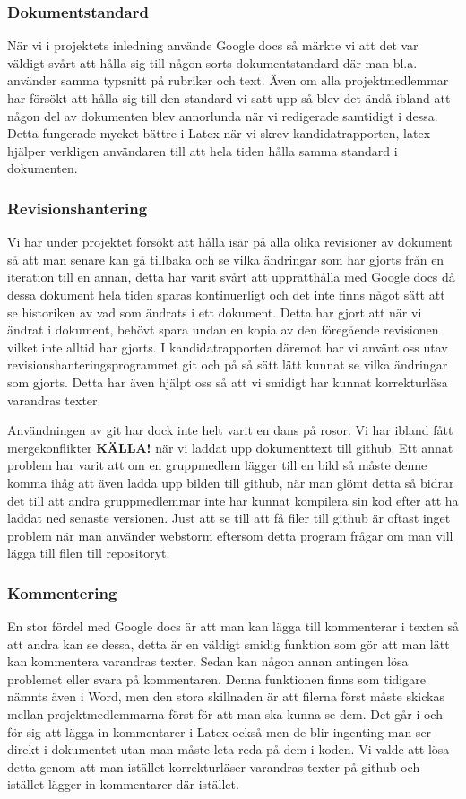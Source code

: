 \subsubsection{Dokumentstandard}
När vi i projektets inledning använde Google docs så märkte vi att det var väldigt svårt att hålla sig till någon sorts dokumentstandard där man bl.a. använder samma typsnitt på rubriker och text. Även om alla projektmedlemmar har försökt att hålla sig till den standard vi satt upp så blev det ändå ibland att någon del av dokumenten blev annorlunda när vi redigerade samtidigt i dessa. Detta fungerade mycket bättre i Latex när vi skrev kandidatrapporten, latex hjälper verkligen användaren till att hela tiden hålla samma standard i dokumenten.

\subsubsection{Revisionshantering}
Vi har under projektet försökt att hålla isär på alla olika revisioner av dokument så att man senare kan gå tillbaka och se vilka ändringar som har gjorts från en iteration till en annan, detta har varit svårt att upprätthålla med Google docs då dessa dokument hela tiden sparas kontinuerligt och det inte finns något sätt att se historiken av vad som ändrats i ett dokument. Detta har gjort att när vi ändrat i dokument, behövt spara undan en kopia av den föregående revisionen vilket inte alltid har gjorts. I kandidatrapporten däremot har vi använt oss utav revisionshanteringsprogrammet git och på så sätt lätt kunnat se vilka ändringar som gjorts. Detta har även hjälpt oss så att vi smidigt har kunnat korrekturläsa varandras texter. 

Användningen av git har dock inte helt varit en dans på rosor. Vi har ibland fått mergekonflikter \textbf{KÄLLA!} när vi laddat upp dokumenttext till github. Ett annat problem har varit att om en gruppmedlem lägger till en bild så måste denne komma ihåg att även ladda upp bilden till github, när man glömt detta så bidrar det till att andra gruppmedlemmar inte har kunnat kompilera sin kod efter att ha laddat ned senaste versionen. Just att se till att få filer till github är oftast inget problem när man använder webstorm eftersom detta program frågar om man vill lägga till filen till repositoryt.

\subsubsection{Kommentering}
En stor fördel med Google docs är att man kan lägga till kommenterar i texten så att andra kan se dessa, detta är en väldigt smidig funktion som gör att man lätt kan kommentera varandras texter. Sedan kan någon annan antingen lösa problemet eller svara på kommentaren. Denna funktionen finns som tidigare nämnts även i Word, men den stora skillnaden är att filerna först måste skickas mellan projektmedlemmarna först för att man ska kunna se dem. Det går i och för sig att lägga in kommentarer i Latex också men de blir ingenting man ser direkt i dokumentet utan man måste leta reda på dem i koden. Vi valde att lösa detta genom att man istället korrekturläser varandras texter på github och istället lägger in kommentarer där istället.


